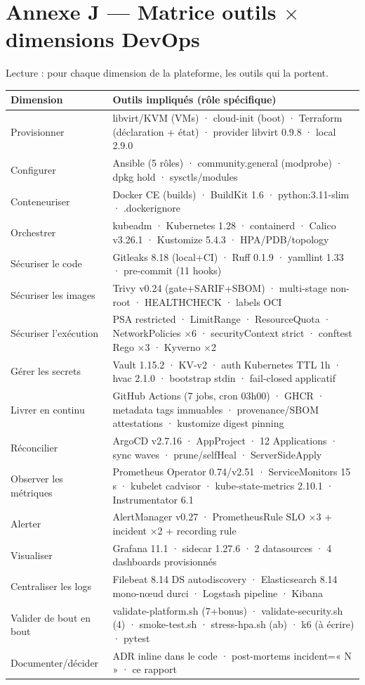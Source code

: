 \documentclass[12pt,a4paper]{article}
\begin{document}
\section*{Annexe J --- Matrice outils $\times$ dimensions DevOps}

Lecture : pour chaque dimension de la plateforme, les outils qui la portent.

\begin{longtable}{@{}p{3.4cm}p{11.0cm}@{}}
\toprule
\textbf{Dimension} & \textbf{Outils impliqués (rôle spécifique)} \\
\midrule
\endhead
Provisionner & libvirt/KVM (VMs) · cloud-init (boot) · Terraform (déclaration + état) · provider libvirt 0.9.8 · local 2.9.0 \\
Configurer & Ansible (5 rôles) · community.general (modprobe) · dpkg hold · sysctls/modules \\
Conteneuriser & Docker CE (builds) · BuildKit 1.6 · python:3.11-slim · .dockerignore \\
Orchestrer & kubeadm · Kubernetes 1.28 · containerd · Calico v3.26.1 · Kustomize 5.4.3 · HPA/PDB/topology \\
Sécuriser le code & Gitleaks 8.18 (local+CI) · Ruff 0.1.9 · yamllint 1.33 · pre-commit (11 hooks) \\
Sécuriser les images & Trivy v0.24 (gate+SARIF+SBOM) · multi-stage non-root · HEALTHCHECK · labels OCI \\
Sécuriser l'exécution & PSA restricted · LimitRange · ResourceQuota · NetworkPolicies ×6 · securityContext strict · conftest Rego ×3 · Kyverno ×2 \\
Gérer les secrets & Vault 1.15.2 · KV-v2 · auth Kubernetes TTL 1h · hvac 2.1.0 · bootstrap stdin · fail-closed applicatif \\
Livrer en continu & GitHub Actions (7 jobs, cron 03h00) · GHCR · metadata tags immuables · provenance/SBOM attestations · kustomize digest pinning \\
Réconcilier & ArgoCD v2.7.16 · AppProject · 12 Applications · sync waves · prune/selfHeal · ServerSideApply \\
Observer les métriques & Prometheus Operator 0.74/v2.51 · ServiceMonitors 15 s · kubelet cadvisor · kube-state-metrics 2.10.1 · Instrumentator 6.1 \\
Alerter & AlertManager v0.27 · PrometheusRule SLO ×3 + incident ×2 + recording rule \\
Visualiser & Grafana 11.1 · sidecar 1.27.6 · 2 datasources · 4 dashboards provisionnés \\
Centraliser les logs & Filebeat 8.14 DS autodiscovery · Elasticsearch 8.14 mono-nœud durci · Logstash pipeline · Kibana \\
Valider de bout en bout & validate-platform.sh (7+bonus) · validate-security.sh (4) · smoke-test.sh · stress-hpa.sh (ab) · k6 (à écrire) · pytest \\
Documenter/décider & ADR inline dans le code · post-mortems incident=« N » · ce rapport \\
\bottomrule
\end{longtable}
\end{document}
